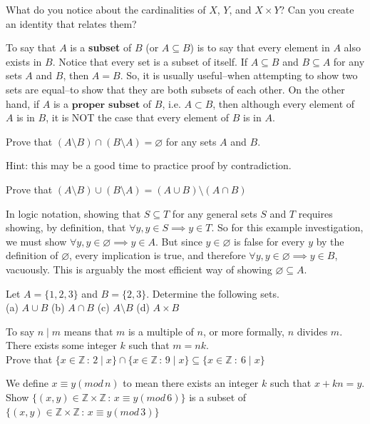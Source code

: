 \begin{exercise}
    What do you notice about the cardinalities of $X$, $Y$, and $X\times Y$? Can you create an identity that relates them?
\end{exercise}

To say that $A$ is a \textbf{subset} of $B$ (or $A\subseteq B$) is to say that every element in $A$ also exists in $B$. Notice that every set is a subset of itself. If $A\subseteq B$ and $B\subseteq A$ for any sets $A$ and $B$, then $A=B$. So, it is usually useful--when attempting to show two sets are equal--to show that they are both subsets of each other. On the other hand, if $A$ is a $\textbf{proper subset}$ of $B$, i.e. $A\subset B$, then although every element of $A$ is in $B$, it is NOT the case that every element of $B$ is in $A$. 

\begin{exercise}
    Prove that $(A\setminus B) \cap (B\setminus A) =\varnothing$ for any sets $A$ and $B$. 
\end{exercise}
Hint: this may be a good time to practice proof by contradiction.
\begin{exercise}
    Prove that $(A\setminus B) \cup (B\setminus A) = (A\cup B) \setminus (A\cap B)$
\end{exercise}

\clearpage
\begin{example}
    In logic notation, showing that $S\subseteq T$ for any general sets $S$ and $T$ requires showing, by definition, that $\forall y, y\in S \implies y\in T$. So for this example investigation, we must show $\forall y, y\in\varnothing \implies y\in A$. But since $y\in\varnothing$ is false for every $y$ by the definition of $\varnothing$, every implication is true, and therefore $\forall y, y\in\varnothing \implies y\in B$, vacuously. This is arguably the most efficient way of showing $\varnothing\subseteq A$.
\end{example}

\begin{exercise}
  Let $A = \{1, 2, 3\}$ and $B = \{2, 3\}$.
  Determine the following sets. \\
  (a) $A \cup B$ \quad
  (b) $A \cap B$ \quad
  (c) $A \setminus B$ \quad
  (d) $A \times B$
\end{exercise}
\begin{exercise}
    To say $n\mid m$ means that $m$ is a multiple of $n$, or more formally, $n$ divides $m$. There exists some integer $k$ such that $m=nk$.\\ 
    Prove that $\{x\in\mathbb{Z}\, : \, 2\mid x\}\cap \{x\in\mathbb{Z}\, : \, 9\mid x\}\subseteq \{x\in\mathbb{Z}\ : \ 6\mid x\}$
\end{exercise}
\begin{exercise}
    We define $x\equiv y (mod\, n)$ to mean there exists an integer $k$ such that $x+kn=y$. Show $\{(x,y)\in\mathbb{Z}\times\mathbb{Z}\, : \, x\equiv y (mod\, 6)\}$ is a subset of $\{(x,y)\in\mathbb{Z}\times\mathbb{Z}\, : \, x\equiv y (mod\, 3)\}$
\end{exercise}

